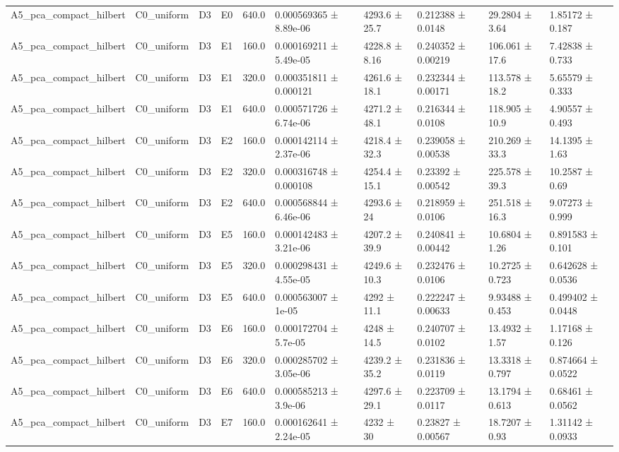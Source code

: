\begin{table}
\begin{tabular}{llllllllll}
A5\_pca\_compact\_hilbert & C0\_uniform & D3 & E0 & 640.0 & 0.000569365 ± 8.89e-06 & 4293.6 ± 25.7 & 0.212388 ± 0.0148 & 29.2804 ± 3.64 & 1.85172 ± 0.187 \\
A5\_pca\_compact\_hilbert & C0\_uniform & D3 & E1 & 160.0 & 0.000169211 ± 5.49e-05 & 4228.8 ± 8.16 & 0.240352 ± 0.00219 & 106.061 ± 17.6 & 7.42838 ± 0.733 \\
A5\_pca\_compact\_hilbert & C0\_uniform & D3 & E1 & 320.0 & 0.000351811 ± 0.000121 & 4261.6 ± 18.1 & 0.232344 ± 0.00171 & 113.578 ± 18.2 & 5.65579 ± 0.333 \\
A5\_pca\_compact\_hilbert & C0\_uniform & D3 & E1 & 640.0 & 0.000571726 ± 6.74e-06 & 4271.2 ± 48.1 & 0.216344 ± 0.0108 & 118.905 ± 10.9 & 4.90557 ± 0.493 \\
A5\_pca\_compact\_hilbert & C0\_uniform & D3 & E2 & 160.0 & 0.000142114 ± 2.37e-06 & 4218.4 ± 32.3 & 0.239058 ± 0.00538 & 210.269 ± 33.3 & 14.1395 ± 1.63 \\
A5\_pca\_compact\_hilbert & C0\_uniform & D3 & E2 & 320.0 & 0.000316748 ± 0.000108 & 4254.4 ± 15.1 & 0.23392 ± 0.00542 & 225.578 ± 39.3 & 10.2587 ± 0.69 \\
A5\_pca\_compact\_hilbert & C0\_uniform & D3 & E2 & 640.0 & 0.000568844 ± 6.46e-06 & 4293.6 ± 24 & 0.218959 ± 0.0106 & 251.518 ± 16.3 & 9.07273 ± 0.999 \\
A5\_pca\_compact\_hilbert & C0\_uniform & D3 & E5 & 160.0 & 0.000142483 ± 3.21e-06 & 4207.2 ± 39.9 & 0.240841 ± 0.00442 & 10.6804 ± 1.26 & 0.891583 ± 0.101 \\
A5\_pca\_compact\_hilbert & C0\_uniform & D3 & E5 & 320.0 & 0.000298431 ± 4.55e-05 & 4249.6 ± 10.3 & 0.232476 ± 0.0106 & 10.2725 ± 0.723 & 0.642628 ± 0.0536 \\
A5\_pca\_compact\_hilbert & C0\_uniform & D3 & E5 & 640.0 & 0.000563007 ± 1e-05 & 4292 ± 11.1 & 0.222247 ± 0.00633 & 9.93488 ± 0.453 & 0.499402 ± 0.0448 \\
A5\_pca\_compact\_hilbert & C0\_uniform & D3 & E6 & 160.0 & 0.000172704 ± 5.7e-05 & 4248 ± 14.5 & 0.240707 ± 0.0102 & 13.4932 ± 1.57 & 1.17168 ± 0.126 \\
A5\_pca\_compact\_hilbert & C0\_uniform & D3 & E6 & 320.0 & 0.000285702 ± 3.05e-06 & 4239.2 ± 35.2 & 0.231836 ± 0.0119 & 13.3318 ± 0.797 & 0.874664 ± 0.0522 \\
A5\_pca\_compact\_hilbert & C0\_uniform & D3 & E6 & 640.0 & 0.000585213 ± 3.9e-06 & 4297.6 ± 29.1 & 0.223709 ± 0.0117 & 13.1794 ± 0.613 & 0.68461 ± 0.0562 \\
A5\_pca\_compact\_hilbert & C0\_uniform & D3 & E7 & 160.0 & 0.000162641 ± 2.24e-05 & 4232 ± 30 & 0.23827 ± 0.00567 & 18.7207 ± 0.93 & 1.31142 ± 0.0933 \\

\end{tabular}
\end{table}
